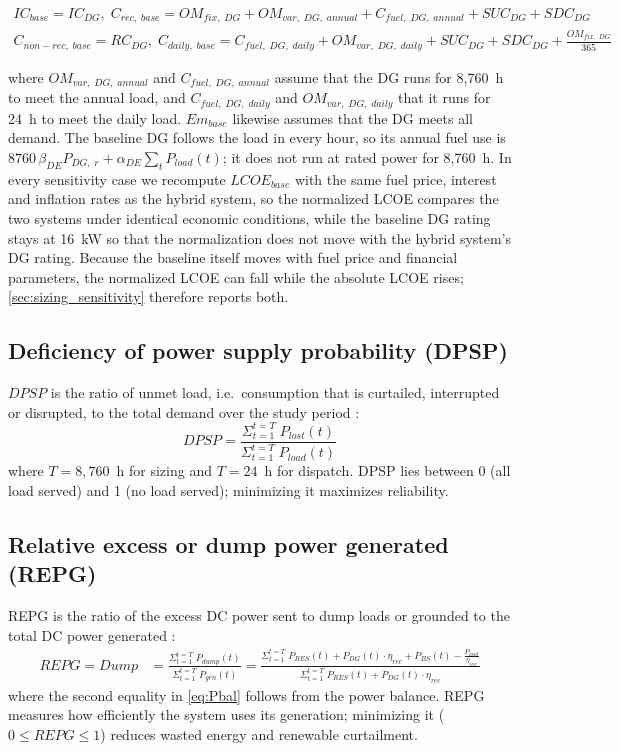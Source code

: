 \documentclass[final,3p,times]{elsarticle}
\begin{document}
\begin{gather*}
    IC_{base} = IC_{DG}, \; C_{rec,\; base} = OM_{fix,\;DG} + OM_{var, \; DG,\; annual} + C_{fuel,\; DG,\; annual} + SUC_{DG} + SDC_{DG}  \\
    C_{non-rec,\; base} = RC_{DG}, \; C_{daily,\; base} = C_{fuel,\; DG,\; daily} + OM_{var, \; DG,\; daily} + SUC_{DG} + SDC_{DG} + \frac{OM_{fix,\;DG}}{365}
\end{gather*}

\noindent where $OM_{var, \; DG,\; annual}$ and $C_{fuel,\; DG,\; annual}$ assume that the DG runs for 8,760~h to meet the annual load, and $C_{fuel,\; DG,\; daily}$ and $OM_{var, \; DG,\; daily}$ that it runs for 24~h to meet the daily load. $Em_{base}$ likewise assumes that the DG meets all demand. The baseline DG follows the load in every hour, so its annual fuel use is $8760\,\beta_{DE} P_{DG,\;r} + \alpha_{DE} \sum_t P_{load}(t)$; it does not run at rated power for 8,760~h. In every sensitivity case we recompute $LCOE_{base}$ with the same fuel price, interest and inflation rates as the hybrid system, so the normalized LCOE compares the two systems under identical economic conditions, while the baseline DG rating stays at 16~kW so that the normalization does not move with the hybrid system's DG rating. Because the baseline itself moves with fuel price and financial parameters, the normalized LCOE can fall while the absolute LCOE rises; \cref{sec:sizing_sensitivity} therefore reports both.

\subsection{Deficiency of power supply probability (DPSP)}
$DPSP$ is the ratio of unmet load, i.e.\ consumption that is curtailed, interrupted or disrupted, to the total demand over the study period \cite{prasad2006}:
\begin{equation}
    DPSP = \frac{\Sigma_{t=1}^{t=T} \; P_{lost}(t)}{\Sigma_{t=1}^{t=T} \; P_{load}(t)}
\end{equation}
where $T = 8{,}760$~h for sizing and $T = 24$~h for dispatch. DPSP lies between 0 (all load served) and 1 (no load served); minimizing it maximizes reliability.

\subsection{Relative excess or dump power generated (REPG)}

REPG is the ratio of the excess DC power sent to dump loads or grounded to the total DC power generated \cite{kaabeche2011b}:
\begin{align}
    REPG = Dump & = \frac{\Sigma_{t=1}^{t=T} \; P_{dump}(t)}{\Sigma_{t=1}^{t=T} \; P_{gen}(t)} = \frac{\Sigma_{t=1}^{t=T} \; P_{RES}(t) + P_{DG}(t) \cdot \eta_{rec} + P_{BS}(t) - \frac{P_{load}}{\eta_{inv}}}{\Sigma_{t=1}^{t=T} \; P_{RES}(t) + P_{DG}(t) \cdot \eta_{rec}} \label{eq:Pbal}
\end{align}
where the second equality in \cref{eq:Pbal} follows from the power balance. REPG measures how efficiently the system uses its generation; minimizing it ($0 \leq REPG \leq 1$) reduces wasted energy and renewable curtailment.
\end{document}
